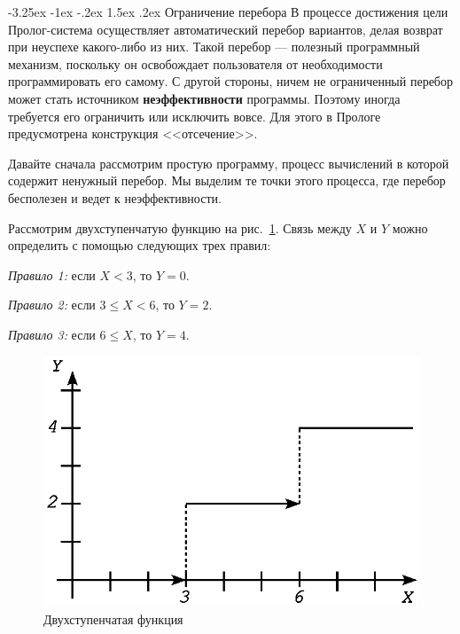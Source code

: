 \documentclass[12pt, openany, twoside]{book} %
\makeatletter
\renewcommand\section{\@startsection {section}{1}{\z@}%
                                   {-3.25ex \@plus -1ex \@minus -.2ex}%
                                   {1.5ex \@plus.2ex}%
                                   {\normalfont\large\bfseries}}
\makeatother
\begin{document}
\section{Ограничение перебора}
В процессе достижения цели Пролог-система осуществляет автоматический перебор вариантов, делая возврат при неуспехе како\-го-либо из них. Такой перебор --- полезный программный механизм, поскольку он освобождает пользователя от необходимости программировать его самому. С другой стороны, ничем не ограниченный перебор может стать источником {\bf неэффективности} программы. Поэтому иногда требуется его ограничить или исключить вовсе. Для этого в Прологе предусмотрена конструкция <<отсечение>>.

Давайте сначала рассмотрим простую программу, процесс вычислений в которой содержит ненужный перебор. Мы выделим те точки этого процесса, где перебор бесполезен и ведет к неэффективности.

Рассмотрим двухступенчатую функцию на рис.~\ref{pic:func_step}. Связь между $X$ и $Y$ можно определить с помощью следующих трех правил:

\emph{Правило 1:} если $X < 3$, то $Y = 0$.

\emph{Правило 2:} если $3 \leq X < 6$, то $Y = 2$.

\emph{Правило 3:} если $6 \leq X$, то $Y = 4$.

\begin{figure}[ht]
\begin{center}
\includegraphics[scale=0.7]{pics/func_step.eps}
\end{center}
\caption{Двухступенчатая функция} \label{pic:func_step}
\end{figure}
\end{document}
